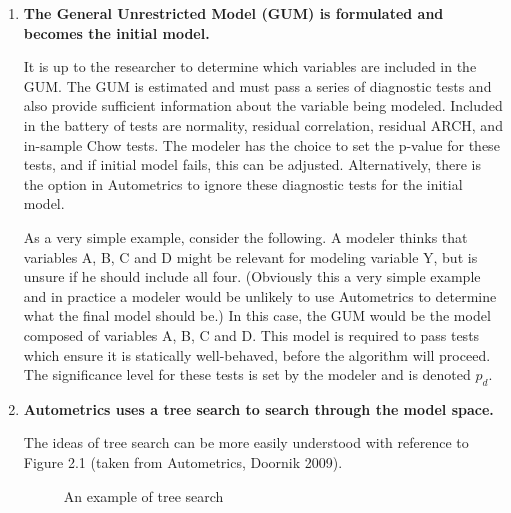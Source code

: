 \documentclass[11pt, oneside]{book}   	%
\begin{document}
\begin{enumerate}


\item \textbf{The General Unrestricted Model (GUM) is formulated and becomes the initial model.}

It is up to the researcher to determine which variables are included in the GUM. The GUM is estimated and must pass a series of diagnostic tests and also provide sufficient information about the variable being modeled. Included in the battery of tests are normality, residual correlation, residual ARCH, and in-sample Chow tests. The modeler has the choice to set the p-value for these tests, and if initial model fails, this can be adjusted. Alternatively, there is the option in Autometrics to ignore these diagnostic tests for the initial model. 

As a very simple example, consider the following. A modeler thinks that variables A, B, C and D might be relevant for modeling variable Y, but is unsure if he should include all four. (Obviously this a very simple example and in practice a modeler would be unlikely to use Autometrics to determine what the final model should be.) In this case, the GUM would be the model composed of variables A, B, C and D. This model is required to pass tests which ensure it is statically well-behaved, before the algorithm will proceed. The significance level for these tests is set by the modeler and is denoted $p_{d}$. 

\item \textbf{Autometrics uses a tree search to search through the model space.} 

The ideas of tree search can be more easily understood with reference to Figure 2.1 (taken from Autometrics, Doornik 2009). 

\begin{figure}

\centering
\caption{An example of tree search}

\end{figure}


\end{enumerate}
\end{document}
